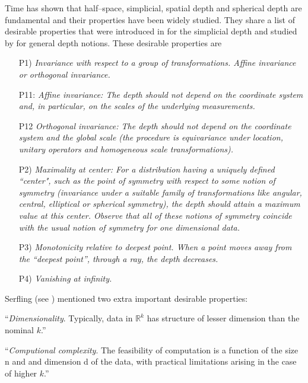 \documentclass[a4paper]{article}
\numberwithin{equation}{section}
\begin{document}
Time has shown that half--space, simplicial, spatial depth and spherical depth are fundamental and their properties have been widely studied. They share a list of desirable properties  that were introduced in \cite{liu1990} for the simplicial depth and studied by \cite{serfling2000} for general depth notions. These desirable properties are
\begin{itemize}
\item [P1)]  \it Invariance with respect to a group of transformations. Affine invariance or orthogonal invariance. 

\rm P11: \it Affine invariance: \rm  The depth should not depend on the coordinate system and, in particular, on the scales of the underlying measurements.

P12 \it Orthogonal invariance: \rm The depth should not depend on the coordinate system and the global scale (the procedure is equivariance under location, unitary operators and homogeneous scale transformations). 
\item [P2)] \it Maximality at center: \rm For a distribution having a uniquely defined ``center", such as the point of symmetry with respect to some notion of symmetry (invariance under a suitable family of transformations like angular, central, elliptical or spherical symmetry), the depth should attain a maximum value at this center. Observe that all of these notions of symmetry coincide with the usual notion of symmetry for one dimensional data. 
\item [P3)] \it Monotonicity relative to deepest point. When a point moves away from the ``deepest point'', through  a ray,  the depth decreases. \rm
\item [P4)] \it Vanishing at infinity. \rm 
\end{itemize}

Serfling (see \cite{serfling2006}) mentioned two extra important desirable properties:


``\textit{Dimensionality}. Typically, data in $\mathbb{R}^k$ has structure of lesser dimension than
the nominal $k$.''

``\textit{Computional  complexity}. The feasibility of computation is a function of the
size n and and dimension d of the data, with practical limitations arising in the
case of higher $k$.''
\end{document}
